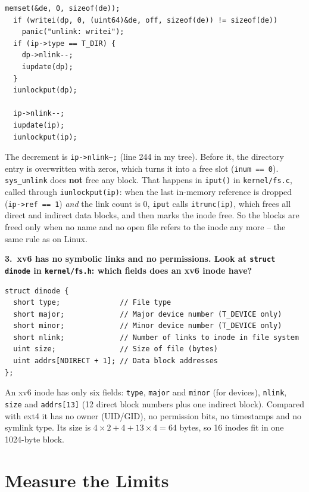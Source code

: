 \documentclass[12pt,a4paper]{article}
\newcommand{\qa}[2]{%
  \par\needspace{5\baselineskip}\medskip
  \noindent\textbf{#1.~#2}\par\smallskip\noindent}
\begin{document}
\begin{lstlisting}[style=code,caption={kernel/sysfile.c, end of sys\_unlink},firstnumber=235]
  memset(&de, 0, sizeof(de));
  if (writei(dp, 0, (uint64)&de, off, sizeof(de)) != sizeof(de))
    panic("unlink: writei");
  if (ip->type == T_DIR) {
    dp->nlink--;
    iupdate(dp);
  }
  iunlockput(dp);

  ip->nlink--;
  iupdate(ip);
  iunlockput(ip);
\end{lstlisting}

The decrement is \texttt{ip->nlink--;} (line 244 in my tree). Before it, the directory entry is overwritten with zeros, which turns it into a free slot (\texttt{inum == 0}). \texttt{sys\_unlink} does \textbf{not} free any block. That happens in \texttt{iput()} in \texttt{kernel/fs.c}, called through \texttt{iunlockput(ip)}: when the last in-memory reference is dropped (\texttt{ip->ref == 1}) \textit{and} the link count is 0, \texttt{iput} calls \texttt{itrunc(ip)}, which frees all direct and indirect data blocks, and then marks the inode free. So the blocks are freed only when no name and no open file refers to the inode any more -- the same rule as on Linux.

\qa{3}{xv6 has no symbolic links and no permissions. Look at \texttt{struct dinode} in \texttt{kernel/fs.h}: which fields does an xv6 inode have?}

\begin{lstlisting}[style=code,caption={kernel/fs.h, the on-disk inode}]
struct dinode {
  short type;              // File type
  short major;             // Major device number (T_DEVICE only)
  short minor;             // Minor device number (T_DEVICE only)
  short nlink;             // Number of links to inode in file system
  uint size;               // Size of file (bytes)
  uint addrs[NDIRECT + 1]; // Data block addresses
};
\end{lstlisting}

An xv6 inode has only six fields: \texttt{type}, \texttt{major} and \texttt{minor} (for devices), \texttt{nlink}, \texttt{size} and \texttt{addrs[13]} (12 direct block numbers plus one indirect block). Compared with ext4 it has no owner (UID/GID), no permission bits, no timestamps and no symlink type. Its size is $4 \times 2 + 4 + 13 \times 4 = 64$ bytes, so 16 inodes fit in one 1024-byte block.

\newpage
\section{Measure the Limits}
\end{document}
